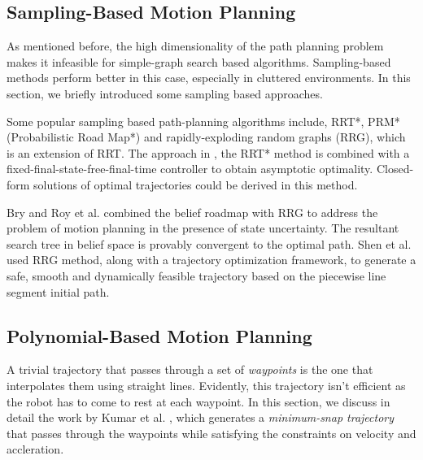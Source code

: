 \subsection{Sampling-Based Motion Planning}
\label{sec:sampling_planning}
As mentioned before, the high dimensionality of the path planning problem makes it infeasible for simple-graph search based algorithms. Sampling-based methods perform better in this case, especially in cluttered environments. In this section, we briefly introduced some sampling based approaches. 

Some popular sampling based path-planning algorithms include, RRT*, PRM* (Probabilistic Road Map*) and rapidly-exploding random graphs (RRG), which is an extension of RRT. The approach in \cite{webb2013kinodynamic}, the RRT* method is combined with a fixed-final-state-free-final-time controller to obtain asymptotic optimality. Closed-form solutions of optimal trajectories could be derived in this method. 

Bry and Roy et al. \cite{bry2011rapidly} combined the belief roadmap with RRG to address the problem of motion planning in the presence of state uncertainty. The resultant search tree in belief space is provably convergent to the optimal path. Shen et al. \cite{shen2017gradient} used RRG method, along with a trajectory optimization framework, to generate a safe, smooth and dynamically feasible trajectory based on the piecewise line segment initial path. 

\subsection{Polynomial-Based Motion Planning}
\label{sec:poly_based_planning}
A trivial trajectory that passes through a set of \textit{waypoints} is the one that interpolates them using straight lines. Evidently, this trajectory isn't efficient as the robot has to come to rest at each waypoint. In this section, we discuss in detail the work by Kumar et al. \cite{mellinger2011minimum}, which generates a \textit{minimum-snap trajectory} that passes through the waypoints while satisfying the constraints on velocity and accleration. 

